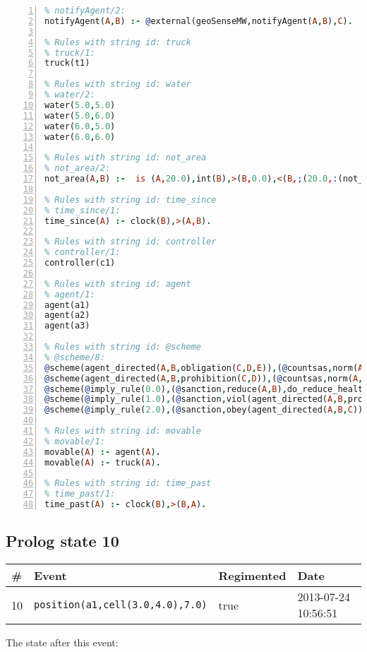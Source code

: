 \documentclass[11pt]{article}\usepackage[utf8]{inputenc}\usepackage{geometry}
\begin{document}
\begin{lstlisting}[language=Prolog, numbers=left]
% Rules with string id: notifyAgent
% notifyAgent/2:
notifyAgent(A,B) :- @external(geoSenseMW,notifyAgent(A,B),C).

% Rules with string id: truck
% truck/1:
truck(t1)

% Rules with string id: water
% water/2:
water(5.0,5.0)
water(5.0,6.0)
water(6.0,5.0)
water(6.0,6.0)

% Rules with string id: not_area
% not_area/2:
not_area(A,B) :-  is (A,20.0),int(B),>(B,0.0),<(B,;(20.0,:(not_area(A,B), is (-(B),20.0)))),int(A),>(A,0.0),<(A,;(20.0,:(area(A,B),-(int(A))))),int(B),>(A,0.0),>(B,0.0),<(A,21.0),<(B,21.0).

% Rules with string id: time_since
% time_since/1:
time_since(A) :- clock(B),>(A,B).

% Rules with string id: controller
% controller/1:
controller(c1)

% Rules with string id: agent
% agent/1:
agent(a1)
agent(a2)
agent(a3)

% Rules with string id: @scheme
% @scheme/8:
@scheme(agent_directed(A,B,obligation(C,D,E)),(@countsas,norm(A,B,F,obligation(C,D,E)),F),false,(listTrue(C)),(time_past(D)),false,[plus(viol(agent_directed(A,B,obligation(C,D,E))))|[]],[plus(obey(agent_directed(A,B,obligation(C,D,E))))|[]])
@scheme(agent_directed(A,B,prohibition(C,D)),(@countsas,norm(A,B,E,prohibition(C,D)),E),(listTrue(C)),false,(false),false,[plus(viol(agent_directed(A,B,prohibition(C,D))))|[]],[plus(obey(agent_directed(A,B,prohibition(C,D))))|[]])
@scheme(@imply_rule(0.0),(@sanction,reduce(A,B),do_reduce_health(A,B),notifyAgent(A,changed(status))),true,false,false,false,[min(reduce(A,B))|[]],[])
@scheme(@imply_rule(1.0),(@sanction,viol(agent_directed(A,B,prohibition(C,D))),do_sanction(D)),true,false,false,false,[min(viol(agent_directed(A,B,prohibition(C,D))))|[]],[])
@scheme(@imply_rule(2.0),(@sanction,obey(agent_directed(A,B,C))),true,false,false,false,[min(obey(agent_directed(A,B,C)))|[]],[])

% Rules with string id: movable
% movable/1:
movable(A) :- agent(A).
movable(A) :- truck(A).

% Rules with string id: time_past
% time_past/1:
time_past(A) :- clock(B),>(B,A).

\end{lstlisting}
\clearpage 
\subsection{Prolog state 10}
\begin{table}[ht]
\centering 
\begin{tabular}{l l l l} 
\textbf{\#} & \textbf{Event} & \textbf{Regimented} & \textbf{Date} \\ [0.5ex] 
\hline
10&\texttt{position(a1,cell(3.0,4.0),7.0)}&true&2013-07-24 10:56:51\\ [1ex] \hline\end{tabular}
\end{table}
The state after this event:
\end{document}
